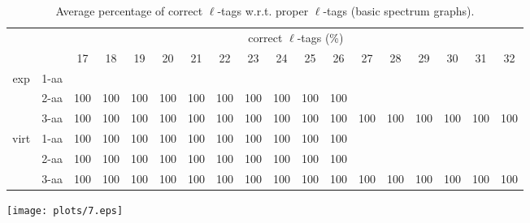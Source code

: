\documentclass{article}
\begin{document}
\begin{table}[h]\tiny
\vspace{3mm}
{\centering
\begin{center}
\begin{tabular}{|c|l|c|c|c|c|c|c|c|c|c|c|c|c|c|c|c|c|}
  \hline
  \multicolumn{2}{|c|}{ } & \multicolumn{ 16 }{|c|}{ correct $\ell$-tags (\%)} \\
  \cline{3- 18}
  \multicolumn{2}{|c|}{ }  & 17 & 18 & 19 & 20 & 21 & 22 & 23 & 24 & 25 & 26 & 27 & 28 & 29 & 30 & 31 & 32\\
  \hline
  \multirow{3}{*}{exp}
&  1-aa  &  &  &  &  &  &  &  &  &  &  &  &  &  &  &  & \\&  2-aa  & 100 & 100 & 100 & 100 & 100 & 100 & 100 & 100 & 100 & 100 &  &  &  &  &  & \\&  3-aa  & 100 & 100 & 100 & 100 & 100 & 100 & 100 & 100 & 100 & 100 & 100 & 100 & 100 & 100 & 100 & 100\\ \hline
  \multirow{3}{*}{virt} 
&  1-aa  & 100 & 100 & 100 & 100 & 100 & 100 & 100 & 100 & 100 & 100 &  &  &  &  &  & \\&  2-aa  & 100 & 100 & 100 & 100 & 100 & 100 & 100 & 100 & 100 & 100 &  &  &  &  &  & \\&  3-aa  & 100 & 100 & 100 & 100 & 100 & 100 & 100 & 100 & 100 & 100 & 100 & 100 & 100 & 100 & 100 & 100\\ \hline
\end{tabular}
\end{center}
\par}
\centering
\caption{ Average percentage of correct $\ell$-tags w.r.t. proper $\ell$-tags (basic spectrum graphs).}
\vspace{3mm}
\label{table:table6}
\end{table}


\texttt{[image: plots/7.eps]}
\end{document}
